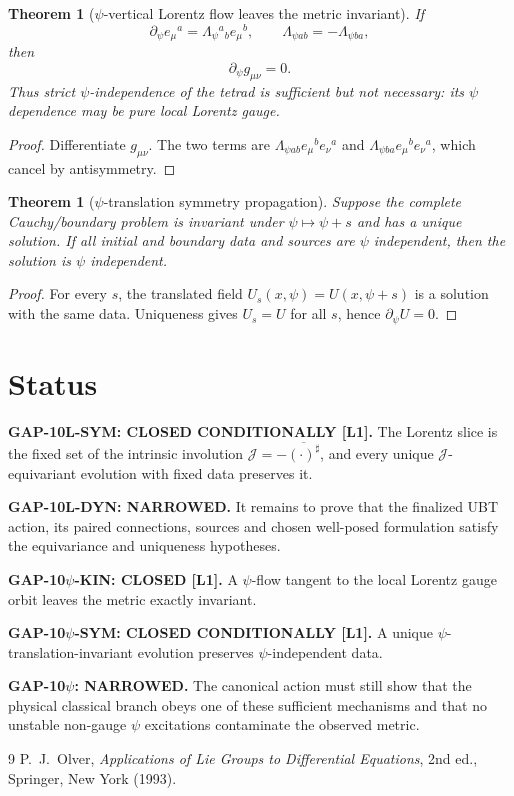 \documentclass[12pt,a4paper]{article}
\newtheorem{theorem}[definition]{Theorem}
\theoremstyle{remark}\newtheorem{remark}[definition]{Remark}
\begin{document}
\begin{theorem}[$\psi$-vertical Lorentz flow leaves the metric invariant]
If
\begin{equation}
 \partial_\psi e_\mu{}^a
 =\Lambda_\psi{}^a{}_b e_\mu{}^b,
 \qquad \Lambda_{\psi ab}=-\Lambda_{\psi ba},
 \label{eq:vertical-flow}
\end{equation}
then
\begin{equation}
 \boxed{\partial_\psi g_{\mu\nu}=0.}
\end{equation}
Thus strict $\psi$-independence of the tetrad is sufficient but not necessary:
its $\psi$ dependence may be pure local Lorentz gauge.
\end{theorem}

\begin{proof}
Differentiate $g_{\mu\nu}$.  The two terms are
$\Lambda_{\psi ab}e_\mu{}^be_\nu{}^a$ and
$\Lambda_{\psi ba}e_\mu{}^be_\nu{}^a$, which cancel by antisymmetry.
\end{proof}

\begin{theorem}[$\psi$-translation symmetry propagation]
Suppose the complete Cauchy/boundary problem is invariant under
$\psi\mapsto\psi+s$ and has a unique solution.  If all initial and boundary
data and sources are $\psi$ independent, then the solution is $\psi$
independent.
\end{theorem}

\begin{proof}
For every $s$, the translated field $U_s(x,\psi)=U(x,\psi+s)$ is a solution
with the same data.  Uniqueness gives $U_s=U$ for all $s$, hence
$\partial_\psi U=0$.
\end{proof}

\section{Status}
\begin{tcolorbox}[colback=green!6!white,colframe=green!55!black,title=Defensible status]
\textbf{GAP-10L-SYM: CLOSED CONDITIONALLY [L1].}
The Lorentz slice is the fixed set of the intrinsic involution
$\mathcal J=-\overline{(\cdot)^\sharp}$, and every unique
$\mathcal J$-equivariant evolution with fixed data preserves it.

\medskip
\textbf{GAP-10L-DYN: NARROWED.}
It remains to prove that the finalized UBT action, its paired connections,
sources and chosen well-posed formulation satisfy the equivariance and
uniqueness hypotheses.

\medskip
\textbf{GAP-10$\psi$-KIN: CLOSED [L1].}
A $\psi$-flow tangent to the local Lorentz gauge orbit leaves the metric
exactly invariant.

\medskip
\textbf{GAP-10$\psi$-SYM: CLOSED CONDITIONALLY [L1].}
A unique $\psi$-translation-invariant evolution preserves $\psi$-independent
data.

\medskip
\textbf{GAP-10$\psi$: NARROWED.}
The canonical action must still show that the physical classical branch obeys
one of these sufficient mechanisms and that no unstable non-gauge
$\psi$ excitations contaminate the observed metric.
\end{tcolorbox}

\begin{thebibliography}{9}
P.~J.~Olver,
\emph{Applications of Lie Groups to Differential Equations}, 2nd ed.,
Springer, New York (1993).
\end{thebibliography}
\end{document}
